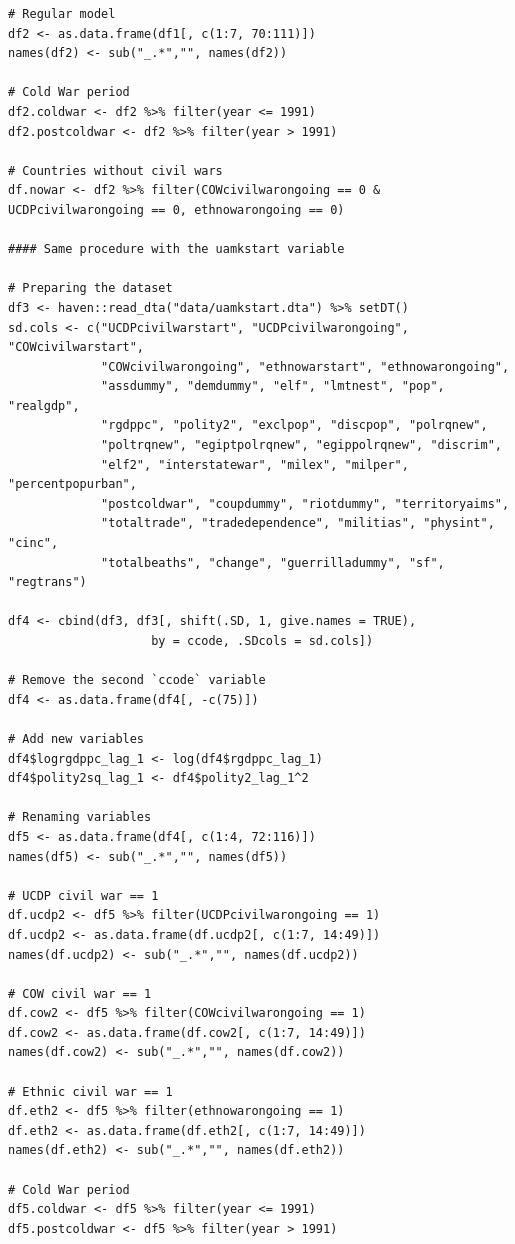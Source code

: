 \begin{verbatim}
# Regular model
df2 <- as.data.frame(df1[, c(1:7, 70:111)])
names(df2) <- sub("_.*","", names(df2)) 

# Cold War period
df2.coldwar <- df2 %>% filter(year <= 1991)
df2.postcoldwar <- df2 %>% filter(year > 1991)

# Countries without civil wars
df.nowar <- df2 %>% filter(COWcivilwarongoing == 0 & UCDPcivilwarongoing == 0, ethnowarongoing == 0)

#### Same procedure with the uamkstart variable

# Preparing the dataset
df3 <- haven::read_dta("data/uamkstart.dta") %>% setDT()
sd.cols <- c("UCDPcivilwarstart", "UCDPcivilwarongoing", "COWcivilwarstart",
             "COWcivilwarongoing", "ethnowarstart", "ethnowarongoing",
             "assdummy", "demdummy", "elf", "lmtnest", "pop", "realgdp",
             "rgdppc", "polity2", "exclpop", "discpop", "polrqnew",
             "poltrqnew", "egiptpolrqnew", "egippolrqnew", "discrim",
             "elf2", "interstatewar", "milex", "milper", "percentpopurban",
             "postcoldwar", "coupdummy", "riotdummy", "territoryaims",
             "totaltrade", "tradedependence", "militias", "physint", "cinc",
             "totalbeaths", "change", "guerrilladummy", "sf", "regtrans")

df4 <- cbind(df3, df3[, shift(.SD, 1, give.names = TRUE),
                    by = ccode, .SDcols = sd.cols]) 

# Remove the second `ccode` variable
df4 <- as.data.frame(df4[, -c(75)])

# Add new variables
df4$logrgdppc_lag_1 <- log(df4$rgdppc_lag_1)
df4$polity2sq_lag_1 <- df4$polity2_lag_1^2

# Renaming variables
df5 <- as.data.frame(df4[, c(1:4, 72:116)])
names(df5) <- sub("_.*","", names(df5)) 

# UCDP civil war == 1
df.ucdp2 <- df5 %>% filter(UCDPcivilwarongoing == 1)
df.ucdp2 <- as.data.frame(df.ucdp2[, c(1:7, 14:49)])
names(df.ucdp2) <- sub("_.*","", names(df.ucdp2)) 

# COW civil war == 1
df.cow2 <- df5 %>% filter(COWcivilwarongoing == 1)
df.cow2 <- as.data.frame(df.cow2[, c(1:7, 14:49)])
names(df.cow2) <- sub("_.*","", names(df.cow2)) 

# Ethnic civil war == 1
df.eth2 <- df5 %>% filter(ethnowarongoing == 1)
df.eth2 <- as.data.frame(df.eth2[, c(1:7, 14:49)])
names(df.eth2) <- sub("_.*","", names(df.eth2)) 

# Cold War period
df5.coldwar <- df5 %>% filter(year <= 1991)
df5.postcoldwar <- df5 %>% filter(year > 1991)


\end{verbatim}
